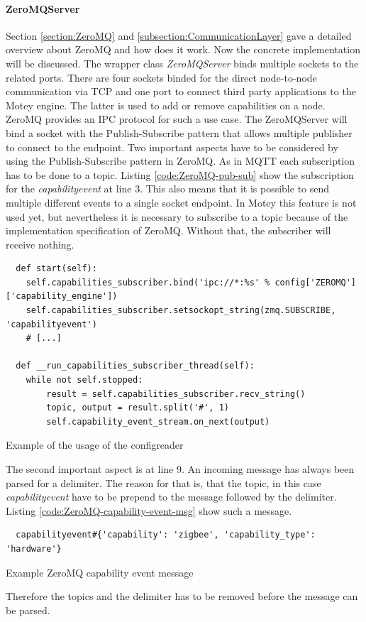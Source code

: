 \paragraph{ZeroMQServer}
Section \ref{section:ZeroMQ} and \ref{subsection:CommunicationLayer} gave a detailed overview about ZeroMQ and how does it work.
Now the concrete implementation will be discussed.
The wrapper class \textit{ZeroMQServer} binds multiple sockets to the related ports.
There are four sockets binded for the direct node-to-node communication via \ac{TCP} and one port to connect third party applications to the Motey engine.
The latter is used to add or remove capabilities on a node.
ZeroMQ provides an \ac{IPC} protocol for such a use case.
The ZeroMQServer will bind a socket with the Publish-Subscribe pattern that allows multiple publisher to connect to the endpoint.
Two important aspects have to be considered by using the Publish-Subscribe pattern in ZeroMQ.
As in \ac{MQTT} each subscription has to be done to a topic.
Listing \ref{code:ZeroMQ-pub-sub} show the subscription for the \textit{capabilityevent} at line 3.
This also means that it is possible to send multiple different events to a single socket endpoint.
In Motey this feature is not used yet, but nevertheless it is necessary to subscribe to a topic because of the implementation specification of ZeroMQ.
Without that, the subscriber will receive nothing.

\begin{listing}[H]
  \begin{verbatim}
  def start(self):
    self.capabilities_subscriber.bind('ipc://*:%s' % config['ZEROMQ']['capability_engine'])
    self.capabilities_subscriber.setsockopt_string(zmq.SUBSCRIBE, 'capabilityevent')
    # [...]

  def __run_capabilities_subscriber_thread(self):
    while not self.stopped:
        result = self.capabilities_subscriber.recv_string()
        topic, output = result.split('#', 1)
        self.capability_event_stream.on_next(output)
  \end{verbatim}
  \caption{Example of the usage of the configreader}
  \label{code:ZeroMQ-pub-sub}
\end{listing}

The second important aspect is at line 9.
An incoming message has always been parsed for a delimiter.
The reason for that is, that the topic, in this case \textit{capabilityevent} have to be prepend to the message followed by the delimiter.
Listing \ref{code:ZeroMQ-capability-event-msg} show such a message.
\begin{listing}[H]
  \begin{verbatim}
  capabilityevent#{'capability': 'zigbee', 'capability_type': 'hardware'}
  \end{verbatim}
  \caption{Example ZeroMQ capability event message}
  \label{code:ZeroMQ-capability-event-msg}
\end{listing}
Therefore the topics and the delimiter has to be removed before the message can be parsed.\newline

